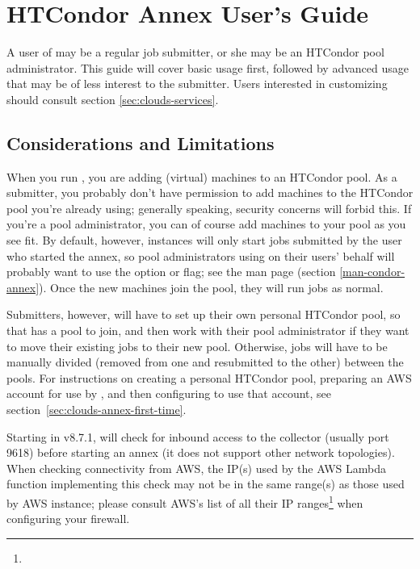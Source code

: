 \section{HTCondor Annex User's Guide}\label{sec:clouds-annex}

A user of  may be a regular job submitter, or she may be an
HTCondor pool administrator.  This guide will cover basic  usage
first, followed by advanced usage that may be of less interest to the
submitter.  Users interested in customizing  should consult
section \ref{sec:clouds-services}.

\subsection{Considerations and Limitations}

When you run , you are adding (virtual) machines to an HTCondor
pool.  As a submitter, you probably don't have permission to add machines to
the HTCondor pool you're already using; generally speaking, security concerns
will forbid this.  If you're a pool administrator, you can of course add
machines to your pool as you see fit.  By default, however, 
instances will only start jobs submitted by the user who started the annex,
so pool administrators using  on their users' behalf will
probably want to use the  option or  flag;
see the man page (section \ref{man-condor-annex}).  Once the new machines
join the pool, they will run jobs as normal.

Submitters, however, will have to set up their own personal HTCondor pool,
so that  has a pool to join, and then work with their pool
administrator if they want to move their existing jobs to their new pool.
Otherwise, jobs will have to be manually divided (removed from one and
resubmitted to the other) between the pools.  For instructions on creating
a personal HTCondor pool, preparing an AWS account for use by ,
and then configuring  to use that account, see
section~\ref{sec:clouds-annex-first-time}.

Starting in v8.7.1,  will check for inbound access to the
collector (usually port 9618) before starting an annex (it does not
support other network topologies).  When checking connectivity
from AWS, the IP(s) used by the AWS Lambda function implementing this check
may not be in the same range(s) as those used by AWS instance; please
consult AWS's list of all their IP
ranges\footnote{}
when configuring your firewall.

